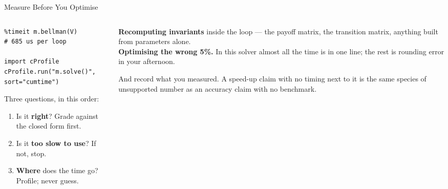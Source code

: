 \begin{frame}[fragile]{Measure Before You Optimise}
\begin{columns}[T]
\begin{column}{0.50\textwidth}
\begin{lstlisting}
%timeit m.bellman(V)
# 685 us per loop

import cProfile
cProfile.run("m.solve()", sort="cumtime")
\end{lstlisting}
\vspace{-1mm}
\small
Three questions, in this order:
\begin{enumerate}\footnotesize
  \item Is it \textbf{right}? Grade against the closed form first.
  \item Is it \textbf{too slow to use}? If not, stop.
  \item \textbf{Where} does the time go? Profile; never guess.
\end{enumerate}
\end{column}
\begin{column}{0.47\textwidth}
\begin{cautionbox}[title=\textbf{The two classic wastes}]\footnotesize
\textbf{Recomputing invariants} inside the loop --- the payoff matrix, the transition matrix, anything built from parameters alone.\\[1mm]
\textbf{Optimising the wrong 5\%.} In this solver almost all the time is in one line; the rest is rounding error in your afternoon.
\end{cautionbox}
\medskip
\begin{examplebox}\footnotesize
And record what you measured. A speed-up claim with no timing next to it is the same species of unsupported number as an accuracy claim with no benchmark.
\end{examplebox}
\end{column}
\end{columns}
\end{frame}

